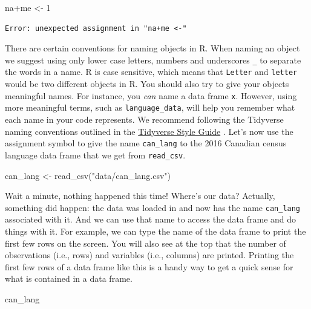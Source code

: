 \documentclass[
]{book}
\newenvironment{Shaded}{\begin{snugshade}}{\end{snugshade}}
\newcommand{\DecValTok}[1]{\textcolor[rgb]{0.06,0.06,0.06}{#1}}
\newcommand{\FunctionTok}[1]{\textcolor[rgb]{0,0,0}{#1}}
\newcommand{\NormalTok}[1]{#1}
\newcommand{\OtherTok}[1]{\textcolor[rgb]{0.37,0.37,0.37}{#1}}
\newcommand{\SpecialCharTok}[1]{\textcolor[rgb]{0,0,0}{#1}}
\newcommand{\StringTok}[1]{\textcolor[rgb]{0.5,0.5,0.5}{#1}}
\begin{document}
\begin{Shaded}
\begin{Highlighting}[]
\NormalTok{na}\SpecialCharTok{+}\NormalTok{me }\OtherTok{\textless{}{-}} \DecValTok{1}
\end{Highlighting}
\end{Shaded}

\begin{verbatim}
Error: unexpected assignment in "na+me <-"
\end{verbatim}

There are certain conventions for naming objects in R. When naming  an object we
suggest using only lower case letters, numbers and underscores \texttt{\_} to separate
the words in a name. R is case sensitive, which means that \texttt{Letter} and
\texttt{letter} would be two different objects in R. You should also try to give your
objects meaningful names. For instance, you \emph{can} name a data frame \texttt{x}.
However, using more meaningful terms, such as \texttt{language\_data}, will help you
remember what each name in your code represents. We recommend following the
Tidyverse naming conventions outlined in the \href{https://principles.tidyverse.org/names-attribute.html\#universal-names}{Tidyverse Style
Guide}
\citep{tidyversestyleguide}. Let's now use the assignment symbol to give the name
\texttt{can\_lang} to the 2016 Canadian census language data frame that we get from
\texttt{read\_csv}.

\begin{Shaded}
\begin{Highlighting}[]
\NormalTok{can\_lang }\OtherTok{\textless{}{-}} \FunctionTok{read\_csv}\NormalTok{(}\StringTok{"data/can\_lang.csv"}\NormalTok{)}
\end{Highlighting}
\end{Shaded}

Wait a minute, nothing happened this time! Where's our data?
Actually, something did happen: the data was loaded in
and now has the name \texttt{can\_lang} associated with it.
And we can use that name to access the data frame and do things with it.
For example, we can type the name of the data frame to print the first few rows
on the screen. You will also see at the top that the number of observations (i.e., rows) and
variables (i.e., columns) are printed. Printing the first few rows of a data frame
like this is a handy way to get a quick sense for what is contained in a data frame.

\begin{Shaded}
\begin{Highlighting}[]
\NormalTok{can\_lang}
\end{Highlighting}
\end{Shaded}
\end{document}
